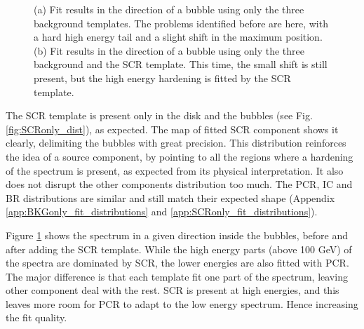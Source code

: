 \begin{figure}[h]
\begin{minipage}[h]{0.45\textwidth}
	  \subcaption{}
	  \label{fig:BKGonly_bubble_spec}
  \end{minipage}	 
  \caption[Spectra before and after adding SCR in a bubble.]{(a) Fit results in the direction of a bubble using only the three background templates. The problems identified before are here, with a hard high energy tail and a slight shift in the maximum position. (b) Fit results in the direction of a bubble using only the three background and the SCR template. This time, the small shift is still present, but the high energy hardening is fitted by the SCR template.}
	  \label{fig:SCRonly_BKGonly_spec_comp}
\end{figure}

The SCR template is present only in the disk and the bubbles (see Fig. \ref{fig:SCRonly_dist}), as expected. The map of fitted SCR component shows it clearly, delimiting the bubbles with great precision. This distribution reinforces the idea of a source component, by pointing to all the regions where a hardening of the spectrum is present, as expected from its physical interpretation.
It also does not disrupt the other components distribution too much. The PCR, IC and BR distributions are similar and still match their expected shape (Appendix \ref{app:BKGonly_fit_distributions} and \ref{app:SCRonly_fit_distributions}).

Figure \ref{fig:SCRonly_BKGonly_spec_comp} shows the spectrum in a given direction inside the bubbles, before and after adding the SCR template. While the high energy parts (above 100 GeV) of the spectra are dominated by SCR, the lower energies are also fitted with PCR. The major difference is that each template fit one part of the spectrum, leaving other component deal with the rest. SCR is present at high energies, and this leaves more room for PCR to adapt to the low energy spectrum. Hence increasing the fit quality.

